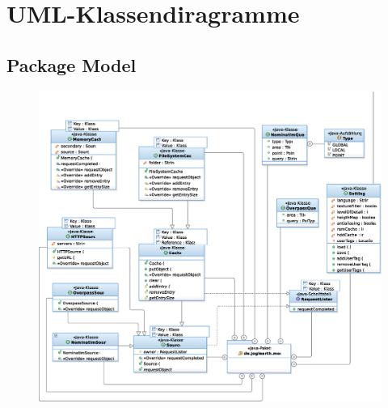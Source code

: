 \documentclass[10pt]{scrreprt}
\begin{document}
\chapter{UML-Klassendiragramme}

\section{Package Model}
\begin{figure}[!htb]
	\includegraphics[scale=0.5]{JoglDiagramm_Model.eps}
\vspace{2.0 cm}
\end{figure}
\end{document}
